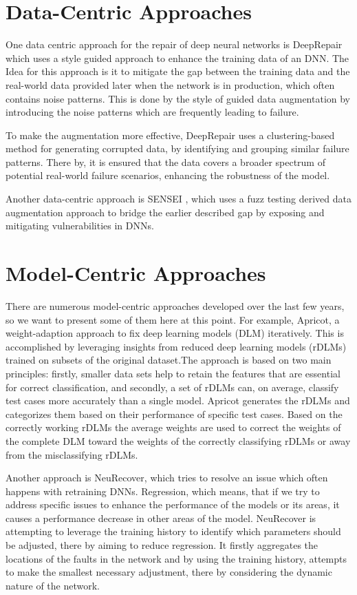 \section{Data-Centric Approaches}\label{sec:data-centric-approaches}
One data centric approach for the repair of deep neural networks is DeepRepair \cite{yu_deeprepair_2022} which uses a style guided approach to enhance the training data of an DNN. The Idea for this approach is it to mitigate the gap between the training data and the real-world data provided later when the network is in production, which often contains noise patterns.
This is done by the style of guided data augmentation by introducing the noise patterns which are frequently leading to failure.

To make the augmentation more effective, DeepRepair uses a clustering-based method for generating corrupted data, by identifying and grouping similar failure patterns.
There by, it is ensured that the data covers a broader spectrum of potential real-world failure scenarios, enhancing the robustness of the model.

Another data-centric approach is SENSEI \cite{gao_fuzz_2020}, which uses a fuzz testing derived data augmentation approach to bridge the earlier described gap by exposing and mitigating vulnerabilities in DNNs.

\section{Model-Centric Approaches}\label{sec:model-centric-approaches}
There are numerous model-centric approaches developed over the last few years, so we want to present some of them here at this point.
For example, Apricot, a weight-adaption approach to fix deep learning models (DLM) iteratively.
This is accomplished by leveraging insights from reduced deep learning models (rDLMs) trained on subsets of the original dataset.The approach is based on two main principles: firstly, smaller data sets help to retain the features that are essential for correct classification, and secondly, a set of rDLMs can, on average, classify test cases more accurately than a single model.
Apricot generates the rDLMs and categorizes them based on their performance of specific test cases.
Based on the correctly working rDLMs the average weights are used to correct the weights of the complete DLM toward the weights of the correctly classifying rDLMs or away from the misclassifying rDLMs.

Another approach is NeuRecover, which tries to resolve an issue which often happens with retraining DNNs. Regression, which means, that if we try to address specific issues to enhance the performance of the models or its areas, it causes a performance decrease in other areas of the model.
NeuRecover is attempting to leverage the training history to identify which parameters should be adjusted, there by aiming to reduce regression.
It firstly aggregates the locations of the faults in the network and by using the training history, attempts to make the smallest necessary adjustment, there by considering the dynamic nature of the network.

